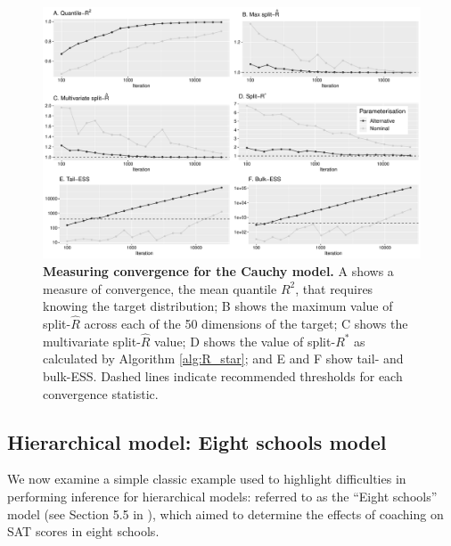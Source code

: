 \documentclass{article}
\begin{document}
\begin{figure}[!htb]
	\centerline{\includegraphics[width=1.0\textwidth]{../output/cauchy_convergence.pdf}}
	\caption{\textbf{Measuring convergence for the Cauchy model.} A shows a measure of convergence, the mean quantile $R^2$, that requires knowing the target distribution; B shows the maximum value of split-$\widehat{R}$ across each of the 50 dimensions of the target; C shows the multivariate split-$\widehat{R}$ value; D shows the value of split-$R^*$ as calculated by Algorithm \ref{alg:R_star}; and E and F show tail- and bulk-ESS. Dashed lines indicate recommended thresholds for each convergence statistic.}
	\label{fig:cauchy_convergence}
\end{figure}

\subsection{Hierarchical model: Eight schools model}\label{sec:eight_shools}
We now examine a simple classic example used to highlight difficulties in performing inference for hierarchical models: referred to as the ``Eight schools'' model (see Section 5.5 in \cite{gelman2013bayesian}), which aimed to determine the effects of coaching on SAT scores in eight schools. 
\end{document}
